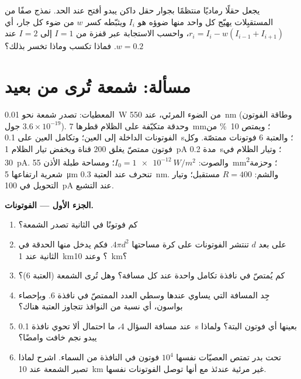 \begin{exercise}[$\star\star\star$]\label{exo:b3:sensory-systems:12}
يجعل  حقلًا رماديًا منتظمًا بجوار حقل داكن
يبدو أفتح عند الحد. نمذج صفًا من المستقبِلات يهيّج كل واحد
منها ضوؤه هو $I_{i}$ ويثبّطه كسر $w$ من ضوء كل جار، أي
$r_{i} = I_{i} - w(I_{i-1} + I_{i+1})$، واحسب الاستجابة عبر
قفزة من $I = 1$ إلى $I = 2$ عند $w = 0.2$. فماذا تكسب
 وماذا تخسر بذلك؟
\end{exercise}

\section{مسألة: شمعة تُرى من بعيد}

\begin{problem}
\label{pb:b3:sensory-systems:1}
المعطيات: تصدر شمعة نحو \qty{0.01}{W} من الضوء المرئي، عند
\qty{550}{nm} (وطاقة الفوتون $3.6\times 10^{-19}$ جول).
وحدقة متكيّفة على الظلام قطرها \qty{7}{mm}؛ ويمتص
 \qty{10}{\%} من الفوتونات الداخلة إلى العين؛
وتكامل العين على \qty{0.1}{s}؛ والعتبة $6$ فوتونات ممتصّة.
وكل فوتون ممتصّ يغلق $200$ قناة ويخفض تيار الظلام
\qty{1}{pA} مدة \qty{0.2}{s}؛ وتيار الظلام في 
\qty{30}{pA}. والصوت: $I_{0} =
\qty{1e-12}{W/m^2}$؛ ومساحة طبلة الأذن \qty{55}{mm^2}؛ وحزمة
شعرية ارتفاعها \qty{5}{\micro m} تنحرف عند العتبة
\qty{0.3}{nm}. والشم: $R = 400$ مستقبل؛ وتيار التحويل في
 \qty{100}{pA} عند التشبع.

\medskip
\noindent\textbf{الجزء الأول --- الفوتونات.}
\begin{enumerate}
  \item كم فوتونًا في الثانية تصدر الشمعة؟
  \item على بعد $d$ تنتشر الفوتونات على كرة مساحتها
        $4\pi d^{2}$. فكم يدخل منها الحدقة في الثانية عند
        \qty{1}{km}؟ وعند \qty{10}{km}؟
  \item كم يُمتصّ في نافذة تكامل واحدة عند كل مسافة؟ وهل
        تُرى الشمعة (العتبة $6$)؟
  \item جِد المسافة التي يساوي عندها وسطي العدد الممتصّ في
        نافذة $6$. وبإحصاء بواسون، أي نسبة من النوافذ تتجاوز
        العتبة هناك؟
  \item عند مسافة السؤال 4، ما احتمال ألا تحوي نافذة
        \qty{0.1}{s} بعينها أي فوتون البتة؟ ولماذا يبدو نجم
        خافت وامضًا؟
  \item تحت بدر تمتص العصيّات نفسها $10^{4}$ فوتون في النافذة
        من السماء. اشرح لماذا تصير الشمعة عند \qty{10}{km}
        غير مرئية عندئذ مع أنها توصل الفوتونات نفسها.
\end{enumerate}


\end{problem}
